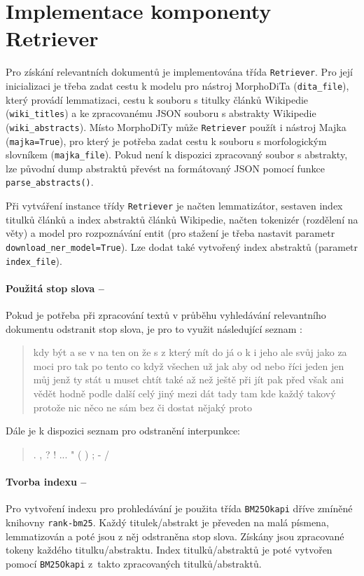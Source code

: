 \section{Implementace komponenty Retriever}
\label{retriever_imp}
Pro získání relevantních dokumentů je implementována třída \texttt{Retriever}. Pro její inicializaci je třeba zadat cestu k modelu pro nástroj MorphoDiTa (\texttt{dita\_file}), který provádí lemmatizaci, cestu k souboru s titulky článků Wikipedie (\texttt{wiki\_titles}) a ke zpracovanému JSON souboru s abstrakty Wikipedie (\texttt{wiki\_abstracts}). Místo MorphoDiTy může \texttt{Retriever} použít i nástroj Majka (\texttt{majka=True}), pro který je potřeba zadat cestu k souboru s morfologickým slovníkem (\texttt{majka\_file}). Pokud není k dispozici zpracovaný soubor s abstrakty, lze původní dump abstraktů převést na formátovaný JSON pomocí funkce \texttt{parse\_abstracts()}.\par
Při vytváření instance třídy \texttt{Retriever} je načten lemmatizátor, sestaven index titulků článků a index abstraktů článků Wikipedie, načten tokenizér (rozdělení na věty) a model pro rozpoznávání entit (pro stažení je třeba nastavit parametr \texttt{download\_ner\_model=True}). Lze dodat také vytvořený index abstraktů (parametr \texttt{index\_file}).\par

\paragraph{Použitá stop slova --}
Pokud je potřeba při zpracování textů v průběhu vyhledávání relevantního dokumentu odstranit stop slova, je pro to využit následující seznam \cite{wiki:frekv}:
\begin{quote}
    {\footnotesize kdy být a se v na ten on že s z který mít do já o k i jeho ale svůj jako za moci pro tak po tento co když všechen už jak aby od nebo říci jeden jen můj jenž ty stát u muset chtít také až než ještě při jít pak před však ani vědět hodně podle další celý jiný mezi dát tady tam kde každý takový protože nic něco ne sám bez či dostat nějaký proto}
\end{quote}
Dále je k dispozici seznam pro odstranění interpunkce:
\begin{quote}
    {\footnotesize . , ? ! ... " ( ) ; - /}
\end{quote}

\paragraph{Tvorba indexu --}
Pro vytvoření indexu pro prohledávání je použita třída \texttt{BM25Okapi} dříve zmíněné knihovny \texttt{rank-bm25}. Každý titulek/abstrakt je převeden na malá písmena, lemmatizován a poté jsou z něj odstraněna stop slova. Získány jsou zpracované tokeny každého titulku/abstraktu. Index titulků/abstraktů je poté vytvořen pomocí \texttt{BM25Okapi} z~takto zpracovaných titulků/abstraktů.

